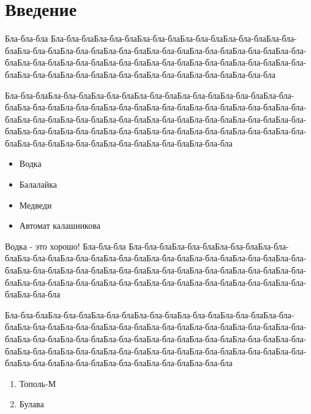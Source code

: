 \chapter*{Введение}

Бла-бла-бла Бла-бла-блаБла-бла-блаБла-бла-блаБла-бла-блаБла-бла-блаБла-бла-блаБла-бла-блаБла-бла-блаБла-бла-блаБла-бла-блаБла-бла-блаБла-бла-блаБла-бла-блаБла-бла-блаБла-бла-блаБла-бла-блаБла-бла-блаБла-бла-блаБла-бла-блаБла-бла-блаБла-бла-блаБла-бла-блаБла-бла-блаБла-бла-блаБла-бла-блаБла-бла-бла

Бла-бла-блаБла-бла-блаБла-бла-блаБла-бла-блаБла-бла-блаБла-бла-блаБла-бла-блаБла-бла-блаБла-бла-блаБла-бла-блаБла-бла-блаБла-бла-блаБла-бла-блаБла-бла-блаБла-бла-блаБла-бла-блаБла-бла-блаБла-бла-блаБла-бла-блаБла-бла-блаБла-бла-блаБла-бла-блаБла-бла-блаБла-бла-блаБла-бла-блаБла-бла-блаБла-бла-блаБла-бла-блаБла-бла-блаБла-бла-блаБла-бла-блаБла-бла-блаБла-бла-бла

\begin{itemize}
	\item Водка
	\item Балалайка
	\item Медведи
	\item Автомат калашникова
\end{itemize}

Водка - это хорошо!
Бла-бла-бла Бла-бла-блаБла-бла-блаБла-бла-блаБла-бла-блаБла-бла-блаБла-бла-блаБла-бла-блаБла-бла-блаБла-бла-блаБла-бла-блаБла-бла-блаБла-бла-блаБла-бла-блаБла-бла-блаБла-бла-блаБла-бла-блаБла-бла-блаБла-бла-блаБла-бла-блаБла-бла-блаБла-бла-блаБла-бла-блаБла-бла-блаБла-бла-блаБла-бла-блаБла-бла-бла

Бла-бла-блаБла-бла-блаБла-бла-блаБла-бла-блаБла-бла-блаБла-бла-блаБла-бла-блаБла-бла-блаБла-бла-блаБла-бла-блаБла-бла-блаБла-бла-блаБла-бла-блаБла-бла-блаБла-бла-блаБла-бла-блаБла-бла-блаБла-бла-блаБла-бла-блаБла-бла-блаБла-бла-блаБла-бла-блаБла-бла-блаБла-бла-блаБла-бла-блаБла-бла-блаБла-бла-блаБла-бла-блаБла-бла-блаБла-бла-блаБла-бла-блаБла-бла-блаБла-бла-бла

\begin{enumerate}
	\item Тополь-М
	\item Булава
\end{enumerate}